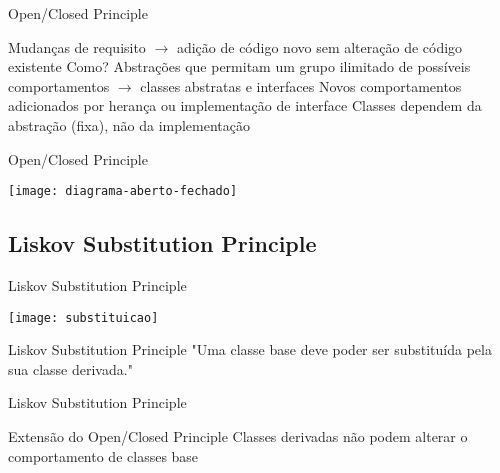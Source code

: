 \documentclass{beamer}
\begin{document}
\begin{frame}{Open/Closed Principle}
 \begin{outline}
  \1 
   Mudanças de requisito $\rightarrow$ adição de código novo sem alteração de código existente
   Como?
     Abstrações que permitam um grupo ilimitado de possíveis comportamentos $\rightarrow$ classes abstratas e interfaces
     Novos comportamentos adicionados por herança ou implementação de interface
     Classes dependem da abstração (fixa), não da implementação
 \end{outline}
\end{frame}

\begin{frame}{Open/Closed Principle}
  \begin{center}
    \texttt{[image: diagrama-aberto-fechado]}
  \end{center}
\end{frame}

\subsection{Liskov Substitution Principle}

\begin{frame}{Liskov Substitution Principle}
  \begin{center}
    \texttt{[image: substituicao]}
  \end{center}
\end{frame}

\begin{frame}{Liskov Substitution Principle}
 "Uma classe base deve poder ser substituída pela sua classe derivada."
\end{frame}

\begin{frame}{Liskov Substitution Principle}
 \begin{outline}
   Extensão do Open/Closed Principle
   Classes derivadas não podem alterar o comportamento de classes base
 \end{outline}
\end{frame}
\end{document}
